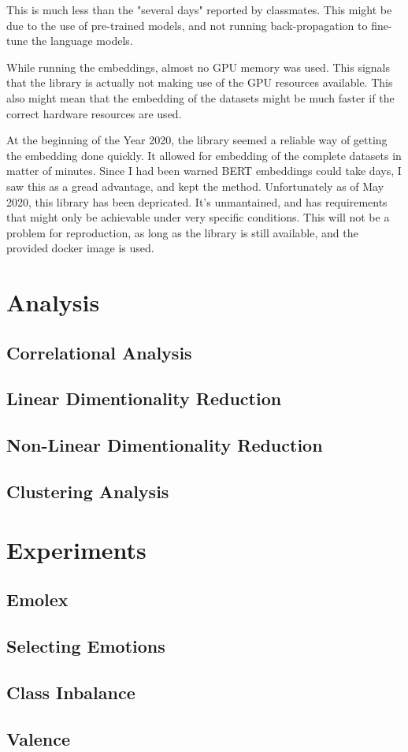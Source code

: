 This is much less than the "several days" reported by classmates. This might be due to the use of pre-trained models, and not running back-propagation to fine-tune the language models.

While running the embeddings, almost no GPU memory was used. This signals that the library is actually not making use of the GPU resources available. This also might mean that the embedding of the datasets might be much faster if the correct hardware resources are used.

At the beginning of the Year 2020, the library seemed a reliable way of getting the embedding done quickly. It allowed for embedding of the complete datasets in matter of minutes. Since I had been warned BERT embeddings could take days, I saw this as a gread advantage, and kept the method. Unfortunately as of May 2020, this library has been depricated. It's unmantained, and has requirements that might only be achievable under very specific conditions. This will not be a problem for reproduction, as long as the library is still available, and the provided docker image is used.

\section{Analysis}\label{sec:Analysis}
\subsection{Correlational Analysis}\label{sub:Correlational Analysis}
\subsection{Linear Dimentionality Reduction}\label{sub:Linear Dimentionality Reduction}
\subsection{Non-Linear Dimentionality Reduction}\label{sub:Non-Linear Dimentionality Reduction}
\subsection{Clustering Analysis}\label{sub:Clustering Analysis}

\section{Experiments}\label{sec:Experiments}
\subsection{Emolex}\label{sub:Emolex}
\subsection{Selecting Emotions}\label{sub:Selecting Emotions}
\subsection{Class Inbalance}\label{sub:Class Inbalance}
\subsection{Valence}\label{sub:Valence}
